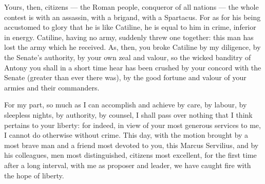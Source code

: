  Yours, then, citizens --- the Roman people, conqueror of all nations --- the whole contest is with an assassin, with a brigand, with a Spartacus. For as for his being accustomed to glory that he is like Catiline, he is equal to him in crime, inferior in energy. Catiline, having no army, suddenly threw one together: this man has lost the army which he received. As, then, you broke Catiline by my diligence, by the Senate's authority, by your own zeal and valour, so the wicked banditry of Antony you shall in a short time hear has been crushed by your concord with the Senate (greater than ever there was), by the good fortune and valour of your armies and their commanders.

 For my part, so much as I can accomplish and achieve by care, by labour, by sleepless nights, by authority, by counsel, I shall pass over nothing that I think pertains to your liberty: for indeed, in view of your most generous services to me, I cannot do otherwise without crime. This day, with the motion brought by a most brave man and a friend most devoted to you, this Marcus Servilius, and by his colleagues, men most distinguished, citizens most excellent, for the first time after a long interval, with me as proposer and leader, we have caught fire with the hope of liberty.

